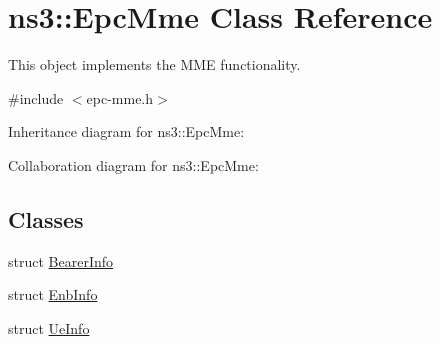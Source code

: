 \hypertarget{classns3_1_1EpcMme}{}\section{ns3\+:\+:Epc\+Mme Class Reference}
\label{classns3_1_1EpcMme}


This object implements the M\+ME functionality.  




{\ttfamily \#include $<$epc-\/mme.\+h$>$}



Inheritance diagram for ns3\+:\+:Epc\+Mme\+:


Collaboration diagram for ns3\+:\+:Epc\+Mme\+:
\subsection*{Classes}
\begin{DoxyCompactItemize}
\item 
struct \hyperlink{structns3_1_1EpcMme_1_1BearerInfo}{Bearer\+Info}
\item 
struct \hyperlink{structns3_1_1EpcMme_1_1EnbInfo}{Enb\+Info}
\item 
struct \hyperlink{structns3_1_1EpcMme_1_1UeInfo}{Ue\+Info}
\end{DoxyCompactItemize}
